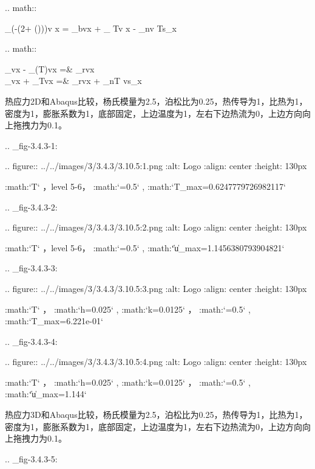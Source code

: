.. math::
   
   \int_{\Omega}(-\nabla\cdot(2\mu\mathbf\varepsilon + \lambda{}(\mathbf \varepsilon)))\cdot\mathbf v \ud x
   = \int_{\Omega}\mathbf b\cdot\mathbf v\ud x  + \int_{\Omega} T\nabla\cdot\mathbf v \ud x - \int_{\Gamma}\mathbf n\cdot\mathbf v T\ud s_x 

.. math::
   
  \int_{\Omega}v\ud x - \int_{\Omega}\nabla\cdot \left(\nabla T\right)v\ud x   =& \int_{\Omega}rv\ud x \\
  \int_{\Omega}v\ud x + \int_{\Omega}\nabla T\cdot\nabla v\ud x   =& \int_{\Omega}rv\ud x + \int_{\Gamma}\mathbf n\cdot\nabla T v\ud s_x
  
热应力2D和Abaqus比较，杨氏模量为2.5，泊松比为0.25，热传导为1，比热为1，密度为1，膨胀系数为1，底部固定，上边温度为1，左右下边热流为0，上边方向向上拖拽力为0.1。  

.. _fig-3.4.3-1:

.. figure:: ../../images/3/3.4.3/3.10.5:1.png
   :alt: Logo
   :align: center
   :height: 130px
	    
   :math:`T` ，level 5-6， :math:`=0.5` , :math:`T_{max}=0.6247779726982117`

.. _fig-3.4.3-2:

.. figure:: ../../images/3/3.4.3/3.10.5:2.png
   :alt: Logo
   :align: center
   :height: 130px

   :math:`T` ，level 5-6， :math:`=0.5` , :math:`\|\mathbf u\|_{max}=1.1456380793904821`

.. _fig-3.4.3-3:

.. figure:: ../../images/3/3.4.3/3.10.5:3.png
   :alt: Logo
   :align: center
   :height: 130px

   :math:`T` ， :math:`h=0.025` , :math:`k=0.0125` ， :math:`=0.5` , :math:`T_{max}=6.221\mathrm e-01`
	   
.. _fig-3.4.3-4:

.. figure:: ../../images/3/3.4.3/3.10.5:4.png
   :alt: Logo
   :align: center
   :height: 130px

   :math:`T` ， :math:`h=0.025` , :math:`k=0.0125` ， :math:`=0.5` , :math:`\|\mathbf u\|_{max}=1.144`

热应力3D和Abaqus比较，杨氏模量为2.5，泊松比为0.25，热传导为1，比热为1，密度为1，膨胀系数为1，底部固定，上边温度为1，左右下边热流为0，上边方向向上拖拽力为0.1。  

.. _fig-3.4.3-5:

